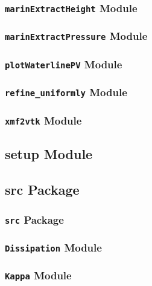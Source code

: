 \documentclass[letterpaper,12pt,english]{sphinxmanual}
\begin{document}
\subsubsection{\texttt{marinExtractHeight} Module}
\label{api/scripts:marinextractheight-module}

\subsubsection{\texttt{marinExtractPressure} Module}
\label{api/scripts:marinextractpressure-module}

\subsubsection{\texttt{plotWaterlinePV} Module}
\label{api/scripts:plotwaterlinepv-module}

\subsubsection{\texttt{refine\_uniformly} Module}
\label{api/scripts:refine-uniformly-module}

\subsubsection{\texttt{xmf2vtk} Module}
\label{api/scripts:xmf2vtk-module}

\subsection{setup Module}
\label{api/setup:setup-module}\label{api/setup::doc}

\subsection{src Package}
\label{api/src::doc}\label{api/src:src-package}

\subsubsection{\texttt{src} Package}
\label{api/src:id1}

\subsubsection{\texttt{Dissipation} Module}
\label{api/src:dissipation-module}

\subsubsection{\texttt{Kappa} Module}
\label{api/src:kappa-module}
\end{document}

